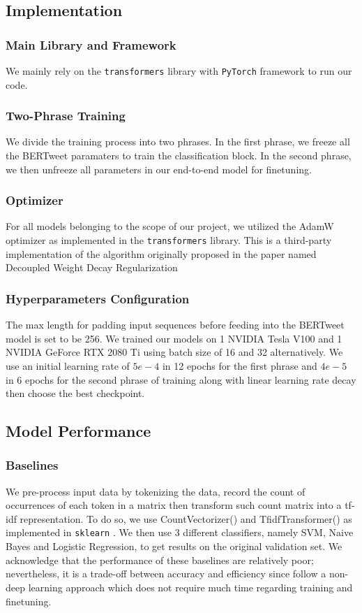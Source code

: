 \documentclass[11pt,a4paper]{article}
\begin{document}
\subsection{Implementation}
\subsubsection{Main Library and Framework}
We mainly rely on the \texttt{transformers} library \cite{1910.03771} with \texttt{PyTorch} framework \cite{paszke2017automatic} to run our code.

\subsubsection{Two-Phrase Training}
We divide the training process into two phrases. In the first phrase, we freeze all the BERTweet paramaters to train the classification block. In the second phrase, we then unfreeze all parameters in our end-to-end model for finetuning.

\subsubsection{Optimizer}
For all models belonging to the scope of our project, we utilized the AdamW optimizer as implemented in the \texttt{transformers} library. This is a third-party implementation of the algorithm originally proposed in the paper named Decoupled Weight Decay Regularization \cite{loshchilov2019decoupled} 


\subsubsection{Hyperparameters Configuration}
The max length for padding input sequences before feeding into the BERTweet model is set to be 256. We trained our models on 1 NVIDIA Tesla V100 and 1 NVIDIA GeForce RTX 2080 Ti using batch size of 16 and 32 alternatively. We use an initial learning rate of $5e-4$ in 12 epochs for the first phrase and $4e-5$ in 6 epochs for the second phrase of training along with linear learning rate decay then choose the best checkpoint. 


\subsection{Model Performance}
\subsubsection{Baselines}
We pre-process input data by tokenizing the data, record the count of occurrences of each token in a matrix then transform such count matrix into a tf-idf representation. To do so, we use CountVectorizer() and TfidfTransformer() as implemented in \texttt{sklearn} \cite{scikit-learn}. We then use 3 different classifiers, namely SVM, Naive Bayes and Logistic Regression, to get results on the original validation set. We acknowledge that the performance of these baselines are relatively poor; nevertheless, it is a trade-off between accuracy and efficiency since follow a non-deep learning approach which does not require much time regarding training and finetuning. 
\end{document}
